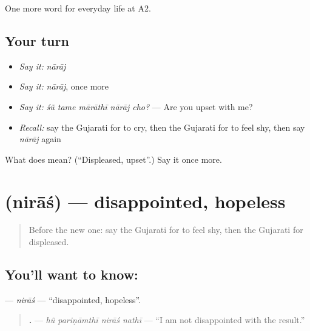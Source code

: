 \begin{grammarlens}[title={What you've built}]
One more word for everyday life at A2.
\end{grammarlens}

\subsection*{Your turn}
\begin{itemize}
\raggedright
  \item \emph{Say it:} \emph{nārāj}
  \item \emph{Say it:} \emph{nārāj}, once more
  \item \emph{Say it:} \emph{śũ tame mārāthī nārāj cho?} — Are you upset with me?
  \item \emph{Recall:} say the Gujarati for to cry, then the Gujarati for to feel shy, then say \emph{nārāj} again
\end{itemize}

\begin{tcolorbox}[breakable,colback=teal!4,colframe=teal!35!black,title={Before you move on}]
What does  mean? (\textquotedblleft{}Displeased, upset\textquotedblright{}.) Say it once more.
\end{tcolorbox}
\section[\texorpdfstring{\gu{નિરાશ} (nirāś)}{નિરાશ (nirāś)}]{ (nirāś) — disappointed, hopeless}

\label{lesson:GU-C267-nirash}



\begin{quote}
Before the new one: say the Gujarati for to feel shy, then the Gujarati for displeased.
\end{quote}

\subsection*{You'll want to know: }
\textbf{} — \emph{nirāś} — \textquotedblleft{}disappointed, hopeless\textquotedblright{}.

\begin{quote}
\textbf{   .} — \emph{hũ pariṇāmthī nirāś nathī} — \textquotedblleft{}I am not disappointed with the result.\textquotedblright{}
\end{quote}


